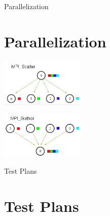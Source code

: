 \documentclass{beamer}
\begin{document}
\begin{frame}[allowframebreaks]{Parallelization}
\section{Parallelization}


\includegraphics[width=4cm]{mpi_scatter}

\framebreak



\includegraphics[width=4cm]{mpi_gather}

\end{frame}

\begin{frame}[allowframebreaks]{Test Plans}
\section{Test Plans}
\end{frame}
\end{document}

